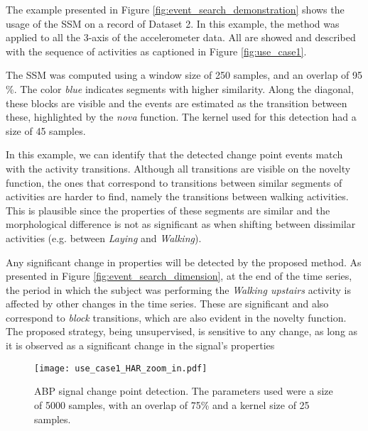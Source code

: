 {The example presented in Figure \ref{fig:event_search_demonstration} shows the usage of the \gls{SSM} on a record of Dataset 2. In this example, the method was applied to all the 3-axis of the accelerometer data. All are showed and described with the sequence of activities as captioned in Figure \ref{fig:use_case1}.
\par
The \gls{SSM} was computed using a window size of 250 samples, and an overlap of 95 \%. The color \textit{blue} indicates segments with higher similarity. Along the diagonal, these blocks are visible and the events are estimated as the transition between these, highlighted by the \textit{nova} function. The kernel used for this detection had a size of 45 samples.
\par
In this example, we can identify that the detected change point events match with the activity transitions. Although all transitions are visible on the novelty function, the ones that correspond to transitions between similar segments of activities are harder to find, namely the transitions between walking activities. This is plausible since the properties of these segments are similar and the morphological difference is not as significant as when shifting between dissimilar activities (e.g. between \textit{Laying} and \textit{Walking}).
\par
Any significant change in properties will be detected by the proposed method. As presented in Figure \ref{fig:event_search_dimension}, at the end of the time series, the period in which the subject was performing the \textit{Walking upstairs} activity is affected by other changes in the time series. These are significant and also correspond to \textit{block} transitions, which are also evident in the novelty function. The proposed strategy, being unsupervised, is sensitive to any change, as long as it is observed as a significant change in the signal's properties\\


\begin{figure}
    \centering
    \texttt{[image: use\_case1\_HAR\_zoom\_in.pdf]}
    \caption{ABP signal change point detection. The parameters used were a size of 5000 samples, with an overlap of 75\% and a kernel size of 25 samples.}
    \label{fig:example1_zoom}
\end{figure}

}
